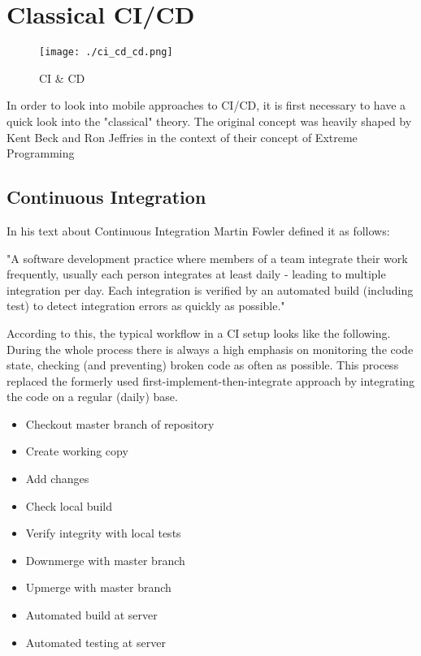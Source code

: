\section{Classical CI/CD}

\begin{figure}[htb]
	\centering
	\texttt{[image: ./ci\_cd\_cd.png]}
	\caption[CI \& CD]{CI \& CD\footnotemark}
	\label{fig_ci_cd}
\end{figure}

In order to look into mobile approaches to CI/CD, it is first necessary to have a quick look into the "classical" theory. The original concept was heavily shaped by Kent Beck and Ron Jeffries in the context of their concept of Extreme Programming~\cite{beck1998extreme, beck2000extreme}

\subsection{Continuous Integration}
In his text about Continuous Integration Martin Fowler defined it as follows:

\begin{quoting}
"A software development practice where members of a team integrate their work frequently, usually each person integrates at least daily - leading to multiple integration per day. Each integration is verified by an automated build (including test) to detect integration errors as quickly as possible."~\cite{fowler2006continuous}
\end{quoting}

According to this, the typical workflow in a CI setup looks like the following. During the whole process there is always a high emphasis on monitoring the code state, checking (and preventing) broken code as often as possible. This process replaced the formerly used first-implement-then-integrate approach by integrating the code on a regular (daily) base.

\begin{itemize}
	\item Checkout master branch of repository
	\item Create working copy
	\item Add changes
	\item Check local build
	\item Verify integrity with local tests
	\item Downmerge with master branch
	\item Upmerge with master branch
	\item Automated build at server
	\item Automated testing at server
\end{itemize} 

